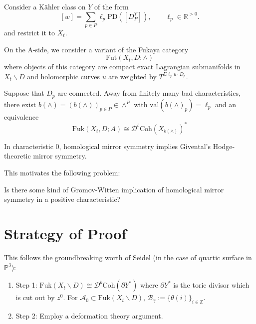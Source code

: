 Consider a Kähler class on $Y$ of the form
\[
[w]=\sum_{p\in P} \ell_p \text{PD}([D_P^Y]), \qquad \ell_p \in \mathbb{R}^{>0}.
\]
and restrict it to $X_t$.

On the A-side, we consider a variant of the Fukaya category
\[
\text{Fut}(X_t, D; \wedge)
\]
where objects of this category are compact exact Lagrangian submanifolds in $X_t \backslash D$ and holomorphic curves $u$ are weighted by $T^{\Sigma \ell_p u \cdot D_p}$.

\begin{theorem}

Suppose that $D_p$ are connected. Away from finitely many bad characteristics, there exist $b(\wedge)=(b(\wedge))
_{p\in P} \in \wedge^P$ with $\text{val}(b(\wedge)_p)=\ell_p$
and an equivalence
\[
\text{Fuk}(X_t, D; A)\cong \mathcal{D}^b\text{Coh}(X_{b(\wedge)})^*
\]

\end{theorem}

\begin{remark}

In characteristic 0, homological mirror symmetry implies Givental's Hodge-theoretic mirror symmetry.

\end{remark}

This motivates the following problem:

\begin{problem}

Is there some kind of Gromov-Witten implication of homological mirror symmetry in a positive characteristic?

\end{problem}

\section{Strategy of Proof}

This follows the groundbreaking worth of Seidel (in the case of quartic surface in $\mathbb{P}^3$):

\begin{enumerate}
\item Step 1: $\text{Fuk}(X_t\backslash D) \cong \mathcal{D}^b\text{Coh}(\partial Y^*)$ where $\partial Y^*$ is the toric divisor which is cut out by $z^0$. For $\mathcal{A}_0 \subset \text{Fuk}(X_t\backslash D)$, $\mathcal{B}_\gamma:= \{\theta(i)\}_{i\in \mathbb{Z}}$.
\item Step 2: Employ a deformation theory argument.
\end{enumerate}

